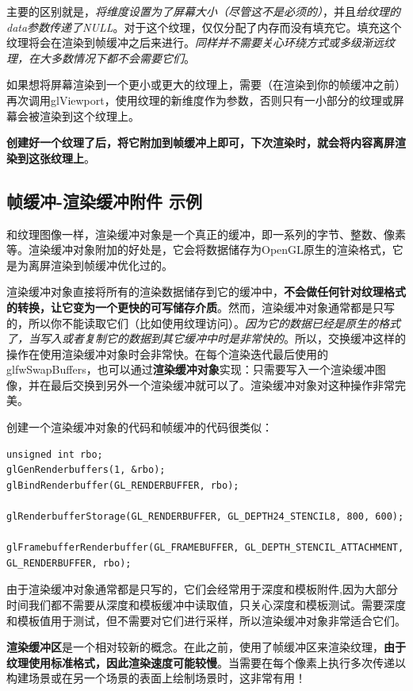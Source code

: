 \documentclass[UTF8,a4paper,12pt]{ctexbook}
\begin{document}
			主要的区别就是，\textit{将维度设置为了屏幕大小（尽管这不是必须的）}，并且\textit{给纹理的data参数传递了NULL}。对于这个纹理，仅仅分配了内存而没有填充它。填充这个纹理将会在渲染到帧缓冲之后来进行。\textit{同样并不需要关心环绕方式或多级渐远纹理，在大多数情况下都不会需要它们}。
			
			如果想将屏幕渲染到一个更小或更大的纹理上，需要（在渲染到你的帧缓冲之前）再次调用glViewport，使用纹理的新维度作为参数，否则只有一小部分的纹理或屏幕会被渲染到这个纹理上。
			
			\textbf{创建好一个纹理了后，将它附加到帧缓冲上即可，下次渲染时，就会将内容离屏渲染到这张纹理上}。
			
			
		\subsection{帧缓冲-渲染缓冲附件 示例}
			和纹理图像一样，渲染缓冲对象是一个真正的缓冲，即一系列的字节、整数、像素等。渲染缓冲对象附加的好处是，它会将数据储存为OpenGL原生的渲染格式，它是为离屏渲染到帧缓冲优化过的。
		
			渲染缓冲对象直接将所有的渲染数据储存到它的缓冲中，\textbf{不会做任何针对纹理格式的转换，让它变为一个更快的可写储存介质}。然而，渲染缓冲对象通常都是只写的，所以你不能读取它们（比如使用纹理访问）。\textit{因为它的数据已经是原生的格式了，当写入或者复制它的数据到其它缓冲中时是非常快的}。所以，交换缓冲这样的操作在使用渲染缓冲对象时会非常快。在每个渲染迭代最后使用的glfwSwapBuffers，也可以通过\textbf{渲染缓冲对象}实现：只需要写入一个渲染缓冲图像，并在最后交换到另外一个渲染缓冲就可以了。渲染缓冲对象对这种操作非常完美。
			
			创建一个渲染缓冲对象的代码和帧缓冲的代码很类似：
			\begin{lstlisting}
unsigned int rbo;
glGenRenderbuffers(1, &rbo);
glBindRenderbuffer(GL_RENDERBUFFER, rbo);

glRenderbufferStorage(GL_RENDERBUFFER, GL_DEPTH24_STENCIL8, 800, 600);

glFramebufferRenderbuffer(GL_FRAMEBUFFER, GL_DEPTH_STENCIL_ATTACHMENT, GL_RENDERBUFFER, rbo);
			\end{lstlisting}
			
			由于渲染缓冲对象通常都是只写的，它们会经常用于深度和模板附件,因为大部分时间我们都不需要从深度和模板缓冲中读取值，只关心深度和模板测试。需要深度和模板值用于测试，但不需要对它们进行采样，所以渲染缓冲对象非常适合它们。
			
			\textbf{渲染缓冲区}是一个相对较新的概念。在此之前，使用了帧缓冲区来渲染纹理，\textbf{由于纹理使用标准格式，因此渲染速度可能较慢}。当需要在每个像素上执行多次传递以构建场景或在另一个场景的表面上绘制场景时，这非常有用！
	
\end{document}
